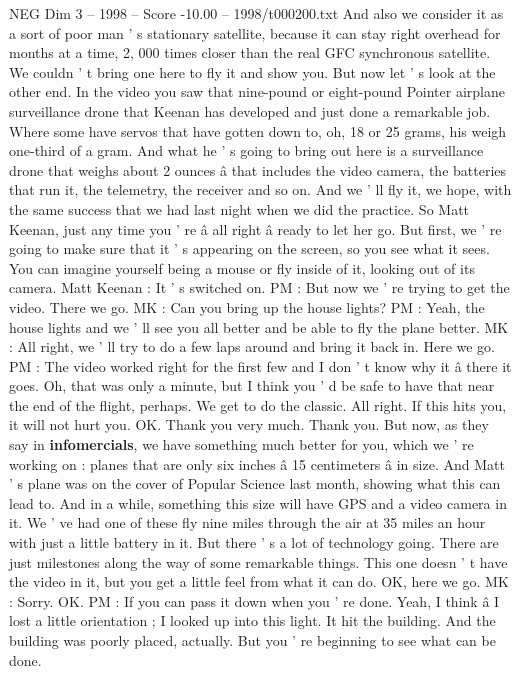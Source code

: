 \begin{textsample}{NEG Dim 3 – 1998 – Score -10.00 – 1998/t000200.txt}
And also we consider it as a sort of poor man ' s stationary satellite, because it can stay right overhead for months at a time, 2, 000 times closer than the real GFC synchronous satellite.
We couldn ' t bring one here to fly it and show you.
But now let ' s look at the other end.
In the video you saw that nine-pound or eight-pound Pointer airplane surveillance drone that Keenan has developed and just done a remarkable job.
Where some have servos that have gotten down to, oh, 18 or 25 grams, his weigh one-third of a gram.
And what he ' s going to bring out here is a surveillance drone that weighs about 2 ounces â that includes the video camera, the batteries that run it, the telemetry, the receiver and so on.
And we ' ll fly it, we hope, with the same success that we had last night when we did the practice.
So Matt Keenan, just any time you ' re â all right â ready to let her go.
But first, we ' re going to make sure that it ' s appearing on the screen, so you see what it sees.
You can imagine yourself being a mouse or fly inside of it, looking out of its camera.
Matt Keenan : It ' s switched on.
PM : But now we ' re trying to get the video.
There we go.
MK : Can you bring up the house lights?
PM : Yeah, the house lights and we ' ll see you all better and be able to fly the plane better.
MK : All right, we ' ll try to do a few laps around and bring it back in.
Here we go.
PM : The video worked right for the first few and I don ' t know why it â there it goes.
Oh, that was only a minute, but I think you ' d be safe to have that near the end of the flight, perhaps.
We get to do the classic.
All right.
If this hits you, it will not hurt you.
OK.
Thank you very much.
Thank you.
But now, as they say in \textbf{infomercials}, we have something much better for you, which we ' re working on : planes that are only six inches â 15 centimeters â in size.
And Matt ' s plane was on the cover of Popular Science last month, showing what this can lead to.
And in a while, something this size will have GPS and a video camera in it.
We ' ve had one of these fly nine miles through the air at 35 miles an hour with just a little battery in it.
But there ' s a lot of technology going.
There are just milestones along the way of some remarkable things.
This one doesn ' t have the video in it, but you get a little feel from what it can do.
OK, here we go.
MK : Sorry.
OK.
PM : If you can pass it down when you ' re done.
Yeah, I think â I lost a little orientation ; I looked up into this light.
It hit the building.
And the building was poorly placed, actually.
But you ' re beginning to see what can be done.

\end{textsample}
